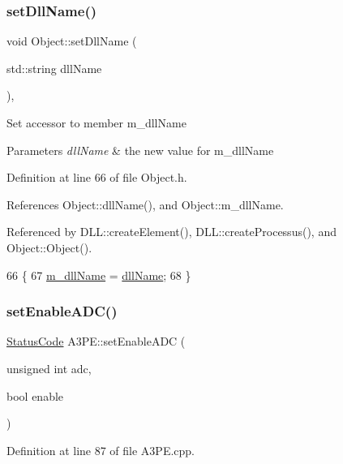 \subsubsection{\texorpdfstring{set\+Dll\+Name()}{setDllName()}}
{\footnotesize\ttfamily void Object\+::set\+Dll\+Name (\begin{DoxyParamCaption}\item[{std\+::string}]{dll\+Name }\end{DoxyParamCaption})\hspace{0.3cm}{\ttfamily [inline]}, {\ttfamily [inherited]}}

Set accessor to member m\+\_\+dll\+Name 
\begin{DoxyParams}{Parameters}
{\em dll\+Name} & the new value for m\+\_\+dll\+Name \\
\hline
\end{DoxyParams}


Definition at line 66 of file Object.\+h.



References Object\+::dll\+Name(), and Object\+::m\+\_\+dll\+Name.



Referenced by D\+L\+L\+::create\+Element(), D\+L\+L\+::create\+Processus(), and Object\+::\+Object().


\begin{DoxyCode}
66                                       \{
67     \hyperlink{classObject_a01afbeacebb8db6831559972ec362eb3}{m\_dllName} = \hyperlink{classObject_a2e3947f2870094c332d7454117f3ec63}{dllName};
68   \}
\end{DoxyCode}
\mbox{\label{classA3PE_a0c90134c3440c8b8c8dc796c43893d64}} 
\subsubsection{\texorpdfstring{set\+Enable\+A\+D\+C()}{setEnableADC()}}
{\footnotesize\ttfamily \hyperlink{classStatusCode}{Status\+Code} A3\+P\+E\+::set\+Enable\+A\+DC (\begin{DoxyParamCaption}\item[{unsigned int}]{adc,  }\item[{bool}]{enable }\end{DoxyParamCaption})}



Definition at line 87 of file A3\+P\+E.\+cpp.



